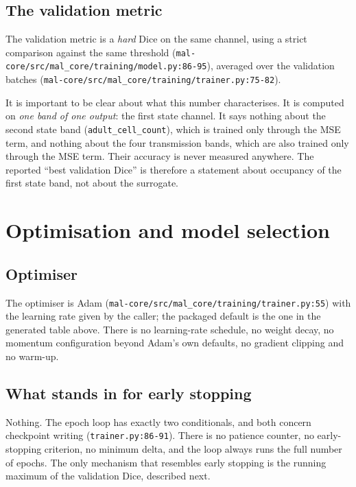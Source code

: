 \documentclass[11pt,a4paper]{article}
\newcommand{\codex}[1]{\texttt{#1}}
\begin{document}
\subsection{The validation metric}

The validation metric is a \emph{hard} Dice on the same channel, using a
strict comparison against the same threshold
(\codex{mal-core/\allowbreak{}src/\allowbreak{}mal\_\allowbreak{}core/\allowbreak{}training/\allowbreak{}model.py:86-95}), averaged over the
validation batches (\codex{mal-core/\allowbreak{}src/\allowbreak{}mal\_\allowbreak{}core/\allowbreak{}training/\allowbreak{}trainer.py:75-82}).

It is important to be clear about what this number characterises. It is
computed on \emph{one band of one output}: the first state channel. It says
nothing about the second state band (\codex{adult\_\allowbreak{}cell\_\allowbreak{}count}), which is
trained only through the MSE term, and nothing about the four transmission
bands, which are also trained only through the MSE term. Their accuracy is
never measured anywhere. The reported ``best validation Dice'' is therefore a
statement about occupancy of the first state band, not about the surrogate.

\section{Optimisation and model selection}

\label{sec:selection}

\subsection{Optimiser}

The optimiser is Adam (\codex{mal-core/\allowbreak{}src/\allowbreak{}mal\_\allowbreak{}core/\allowbreak{}training/\allowbreak{}trainer.py:55})
with the learning rate given by the caller; the packaged default is the one
in the generated table above. There is no learning-rate schedule, no weight
decay, no momentum configuration beyond Adam's own defaults, no gradient
clipping and no warm-up.

\subsection{What stands in for early stopping}

Nothing. The epoch loop has exactly two conditionals, and both concern
checkpoint writing (\codex{trainer.py:86-91}). There is no patience counter,
no early-stopping criterion, no minimum delta, and the loop always runs the
full number of epochs. The only mechanism that resembles early stopping is
the running maximum of the validation Dice, described next.
\end{document}
